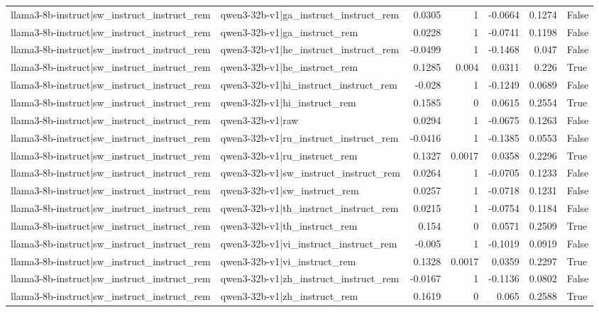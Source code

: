 \begin{table}
\begin{tabular}{l l r r r r l}
llama3-8b-instruct|sw_instruct_instruct_rem & qwen3-32b-v1|ga_instruct_instruct_rem & 0.0305 & 1 & -0.0664 & 0.1274 & False \\
llama3-8b-instruct|sw_instruct_instruct_rem & qwen3-32b-v1|ga_instruct_rem & 0.0228 & 1 & -0.0741 & 0.1198 & False \\
llama3-8b-instruct|sw_instruct_instruct_rem & qwen3-32b-v1|he_instruct_instruct_rem & -0.0499 & 1 & -0.1468 & 0.047 & False \\
llama3-8b-instruct|sw_instruct_instruct_rem & qwen3-32b-v1|he_instruct_rem & 0.1285 & 0.004 & 0.0311 & 0.226 & True \\
llama3-8b-instruct|sw_instruct_instruct_rem & qwen3-32b-v1|hi_instruct_instruct_rem & -0.028 & 1 & -0.1249 & 0.0689 & False \\
llama3-8b-instruct|sw_instruct_instruct_rem & qwen3-32b-v1|hi_instruct_rem & 0.1585 & 0 & 0.0615 & 0.2554 & True \\
llama3-8b-instruct|sw_instruct_instruct_rem & qwen3-32b-v1|raw & 0.0294 & 1 & -0.0675 & 0.1263 & False \\
llama3-8b-instruct|sw_instruct_instruct_rem & qwen3-32b-v1|ru_instruct_instruct_rem & -0.0416 & 1 & -0.1385 & 0.0553 & False \\
llama3-8b-instruct|sw_instruct_instruct_rem & qwen3-32b-v1|ru_instruct_rem & 0.1327 & 0.0017 & 0.0358 & 0.2296 & True \\
llama3-8b-instruct|sw_instruct_instruct_rem & qwen3-32b-v1|sw_instruct_instruct_rem & 0.0264 & 1 & -0.0705 & 0.1233 & False \\
llama3-8b-instruct|sw_instruct_instruct_rem & qwen3-32b-v1|sw_instruct_rem & 0.0257 & 1 & -0.0718 & 0.1231 & False \\
llama3-8b-instruct|sw_instruct_instruct_rem & qwen3-32b-v1|th_instruct_instruct_rem & 0.0215 & 1 & -0.0754 & 0.1184 & False \\
llama3-8b-instruct|sw_instruct_instruct_rem & qwen3-32b-v1|th_instruct_rem & 0.154 & 0 & 0.0571 & 0.2509 & True \\
llama3-8b-instruct|sw_instruct_instruct_rem & qwen3-32b-v1|vi_instruct_instruct_rem & -0.005 & 1 & -0.1019 & 0.0919 & False \\
llama3-8b-instruct|sw_instruct_instruct_rem & qwen3-32b-v1|vi_instruct_rem & 0.1328 & 0.0017 & 0.0359 & 0.2297 & True \\
llama3-8b-instruct|sw_instruct_instruct_rem & qwen3-32b-v1|zh_instruct_instruct_rem & -0.0167 & 1 & -0.1136 & 0.0802 & False \\
llama3-8b-instruct|sw_instruct_instruct_rem & qwen3-32b-v1|zh_instruct_rem & 0.1619 & 0 & 0.065 & 0.2588 & True \\

\end{tabular}
\end{table}
